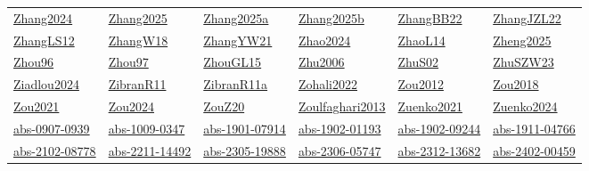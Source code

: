\begin{longtable}{*{6}{l}}
\hyperref[detail:Zhang2024]{Zhang2024} & \hyperref[detail:Zhang2025]{Zhang2025} & \hyperref[detail:Zhang2025a]{Zhang2025a} & \hyperref[detail:Zhang2025b]{Zhang2025b} & \hyperref[detail:ZhangBB22]{ZhangBB22} & \hyperref[detail:ZhangJZL22]{ZhangJZL22}\\ 
\hyperref[detail:ZhangLS12]{ZhangLS12} & \hyperref[detail:ZhangW18]{ZhangW18} & \hyperref[detail:ZhangYW21]{ZhangYW21} & \hyperref[detail:Zhao2024]{Zhao2024} & \hyperref[detail:ZhaoL14]{ZhaoL14} & \hyperref[detail:Zheng2025]{Zheng2025}\\ 
\hyperref[detail:Zhou96]{Zhou96} & \hyperref[detail:Zhou97]{Zhou97} & \hyperref[detail:ZhouGL15]{ZhouGL15} & \hyperref[detail:Zhu2006]{Zhu2006} & \hyperref[detail:ZhuS02]{ZhuS02} & \hyperref[detail:ZhuSZW23]{ZhuSZW23}\\ 
\hyperref[detail:Ziadlou2024]{Ziadlou2024} & \hyperref[detail:ZibranR11]{ZibranR11} & \hyperref[detail:ZibranR11a]{ZibranR11a} & \hyperref[detail:Zohali2022]{Zohali2022} & \hyperref[detail:Zou2012]{Zou2012} & \hyperref[detail:Zou2018]{Zou2018}\\ 
\hyperref[detail:Zou2021]{Zou2021} & \hyperref[detail:Zou2024]{Zou2024} & \hyperref[detail:ZouZ20]{ZouZ20} & \hyperref[detail:Zoulfaghari2013]{Zoulfaghari2013} & \hyperref[detail:Zuenko2021]{Zuenko2021} & \hyperref[detail:Zuenko2024]{Zuenko2024}\\ 
\hyperref[detail:abs-0907-0939]{abs-0907-0939} & \hyperref[detail:abs-1009-0347]{abs-1009-0347} & \hyperref[detail:abs-1901-07914]{abs-1901-07914} & \hyperref[detail:abs-1902-01193]{abs-1902-01193} & \hyperref[detail:abs-1902-09244]{abs-1902-09244} & \hyperref[detail:abs-1911-04766]{abs-1911-04766}\\ 
\hyperref[detail:abs-2102-08778]{abs-2102-08778} & \hyperref[detail:abs-2211-14492]{abs-2211-14492} & \hyperref[detail:abs-2305-19888]{abs-2305-19888} & \hyperref[detail:abs-2306-05747]{abs-2306-05747} & \hyperref[detail:abs-2312-13682]{abs-2312-13682} & \hyperref[detail:abs-2402-00459]{abs-2402-00459}\\ 
\end{longtable}
